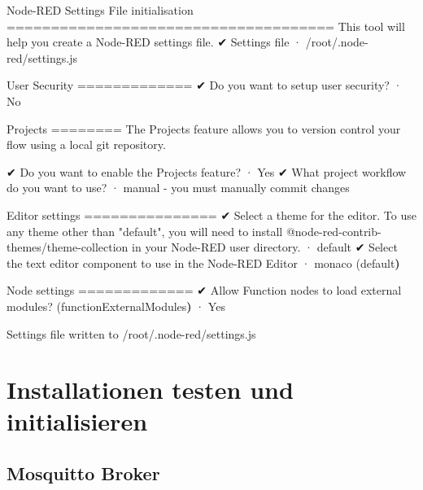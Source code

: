 \documentclass[
  11pt,
  a4paperpaper,
  oneside, openany  ,captions=tableheading
]{scrbook}
\newenvironment{Shaded}{\begin{snugshade}}{\end{snugshade}}
\newcommand{\AttributeTok}[1]{\textcolor[rgb]{0.40,0.45,0.13}{#1}}
\newcommand{\ErrorTok}[1]{\textcolor[rgb]{0.68,0.00,0.00}{#1}}
\newcommand{\ExtensionTok}[1]{\textcolor[rgb]{0.00,0.23,0.31}{#1}}
\newcommand{\KeywordTok}[1]{\textcolor[rgb]{0.00,0.23,0.31}{\textbf{#1}}}
\newcommand{\NormalTok}[1]{\textcolor[rgb]{0.00,0.23,0.31}{#1}}
\newcommand{\PreprocessorTok}[1]{\textcolor[rgb]{0.68,0.00,0.00}{#1}}
\newcommand{\StringTok}[1]{\textcolor[rgb]{0.13,0.47,0.30}{#1}}
\theoremstyle{definition}
\theoremstyle{remark}
\begin{document}
\begin{Shaded}
\begin{Highlighting}[]
\ExtensionTok{Node{-}RED}\NormalTok{ Settings File initialisation}
\ExtensionTok{=====================================}
\ExtensionTok{This}\NormalTok{ tool will help you create a Node{-}RED settings file.}
\ExtensionTok{✔}\NormalTok{ Settings file · /root/.node{-}red/settings.js}

\ExtensionTok{User}\NormalTok{ Security}
\ExtensionTok{=============}
\ExtensionTok{✔}\NormalTok{ Do you want to setup user security}\PreprocessorTok{?}\NormalTok{ · No}

\ExtensionTok{Projects}
\ExtensionTok{========}
\ExtensionTok{The}\NormalTok{ Projects feature allows you to version control your flow using a local git repository.}

\ExtensionTok{✔}\NormalTok{ Do you want to enable the Projects feature}\PreprocessorTok{?}\NormalTok{ · Yes}
\ExtensionTok{✔}\NormalTok{ What project workflow do you want to use}\PreprocessorTok{?}\NormalTok{ · manual }\AttributeTok{{-}}\NormalTok{ you must manually commit changes}

\ExtensionTok{Editor}\NormalTok{ settings}
\ExtensionTok{===============}
\ExtensionTok{✔}\NormalTok{ Select a theme for the editor. To use any theme other than }\StringTok{"default"}\NormalTok{, you will need to install @node{-}red{-}contrib{-}themes/theme{-}collection in your Node{-}RED user directory. · default}
\ExtensionTok{✔}\NormalTok{ Select the text editor component to use in the Node{-}RED Editor · monaco }\ErrorTok{(}\ExtensionTok{default}\KeywordTok{)}

\ExtensionTok{Node}\NormalTok{ settings}
\ExtensionTok{=============}
\ExtensionTok{✔}\NormalTok{ Allow Function nodes to load external modules}\PreprocessorTok{?} \ErrorTok{(}\ExtensionTok{functionExternalModules}\KeywordTok{)} \ExtensionTok{·}\NormalTok{ Yes}

\ExtensionTok{Settings}\NormalTok{ file written to /root/.node{-}red/settings.js}
\end{Highlighting}
\end{Shaded}

\section{Installationen testen und
initialisieren}\label{installationen-testen-und-initialisieren}

\subsection{Mosquitto Broker}\label{mosquitto-broker}
\end{document}
